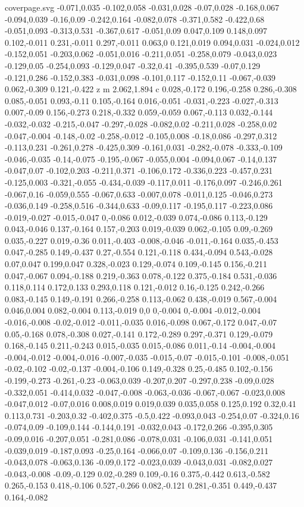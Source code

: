 \begin{filecontents}[noheader]{coverpage.svg}
-0.071,0.035 -0.102,0.058 -0.031,0.028 -0.07,0.028 -0.168,0.067 -0.094,0.039 -0.16,0.09 -0.242,0.164 -0.082,0.078 -0.371,0.582 -0.422,0.68 -0.051,0.093 -0.313,0.531 -0.367,0.617 -0.051,0.09 0.047,0.109 0.148,0.097 0.102,-0.011 0.231,-0.011 0.297,-0.011 0.063,0 0.121,0.019 0.094,0.031 -0.024,0.012 -0.152,0.051 -0.203,0.062 -0.051,0.016 -0.211,0.051 -0.258,0.079 -0.043,0.023 -0.129,0.05 -0.254,0.093 -0.129,0.047 -0.32,0.41 -0.395,0.539 -0.07,0.129 -0.121,0.286 -0.152,0.383 -0.031,0.098 -0.101,0.117 -0.152,0.11 -0.067,-0.039 0.062,-0.309 0.121,-0.422 z m 2.062,1.894 c 0.028,-0.172 0.196,-0.258 0.286,-0.308 0.085,-0.051 0.093,-0.11 0.105,-0.164 0.016,-0.051 -0.031,-0.223 -0.027,-0.313 0.007,-0.09 0.156,-0.273 0.218,-0.332 0.059,-0.059 0.067,-0.113 0.032,-0.144 -0.032,-0.032 -0.215,-0.047 -0.297,-0.028 -0.082,0.02 -0.211,0.028 -0.258,0.02 -0.047,-0.004 -0.148,-0.02 -0.258,-0.012 -0.105,0.008 -0.18,0.086 -0.297,0.312 -0.113,0.231 -0.261,0.278 -0.425,0.309 -0.161,0.031 -0.282,-0.078 -0.333,-0.109 -0.046,-0.035 -0.14,-0.075 -0.195,-0.067 -0.055,0.004 -0.094,0.067 -0.14,0.137 -0.047,0.07 -0.102,0.203 -0.211,0.371 -0.106,0.172 -0.336,0.223 -0.457,0.231 -0.125,0.003 -0.321,-0.055 -0.434,-0.039 -0.117,0.011 -0.176,0.097 -0.246,0.261 -0.067,0.16 -0.059,0.555 -0.067,0.633 -0.007,0.078 -0.011,0.125 -0.046,0.273 -0.036,0.149 -0.258,0.516 -0.344,0.633 -0.09,0.117 -0.195,0.117 -0.223,0.086 -0.019,-0.027 -0.015,-0.047 0,-0.086 0.012,-0.039 0.074,-0.086 0.113,-0.129 0.043,-0.046 0.137,-0.164 0.157,-0.203 0.019,-0.039 0.062,-0.105 0.09,-0.269 0.035,-0.227 0.019,-0.36 0.011,-0.403 -0.008,-0.046 -0.011,-0.164 0.035,-0.453 0.047,-0.285 0.149,-0.437 0.27,-0.554 0.121,-0.118 0.434,-0.094 0.543,-0.028 0.07,0.047 0.199,0.047 0.328,-0.023 0.129,-0.074 0.109,-0.145 0.156,-0.211 0.047,-0.067 0.094,-0.188 0.219,-0.363 0.078,-0.122 0.375,-0.184 0.531,-0.036 0.118,0.114 0.172,0.133 0.293,0.118 0.121,-0.012 0.16,-0.125 0.242,-0.266 0.083,-0.145 0.149,-0.191 0.266,-0.258 0.113,-0.062 0.438,-0.019 0.567,-0.004 0.046,0.004 0.082,-0.004 0.113,-0.019 0,0 0,-0.004 0,-0.004 -0.012,-0.004 -0.016,-0.008 -0.02,-0.012 -0.011,-0.035 0.016,-0.098 0.067,-0.172 0.047,-0.07 0.05,-0.168 0.078,-0.308 0.027,-0.141 0.172,-0.289 0.297,-0.371 0.129,-0.079 0.168,-0.145 0.211,-0.243 0.015,-0.035 0.015,-0.086 0.011,-0.14 -0.004,-0.004 -0.004,-0.012 -0.004,-0.016 -0.007,-0.035 -0.015,-0.07 -0.015,-0.101 -0.008,-0.051 -0.02,-0.102 -0.02,-0.137 -0.004,-0.106 0.149,-0.328 0.25,-0.485 0.102,-0.156 -0.199,-0.273 -0.261,-0.23 -0.063,0.039 -0.207,0.207 -0.297,0.238 -0.09,0.028 -0.332,0.051 -0.414,0.032 -0.047,-0.008 -0.063,-0.036 -0.067,-0.067 -0.023,0.008 -0.047,0.012 -0.07,0.016 0.008,0.019 0.019,0.039 0.035,0.058 0.125,0.192 0.32,0.41 0.113,0.731 -0.203,0.32 -0.402,0.375 -0.5,0.422 -0.093,0.043 -0.254,0.07 -0.324,0.16 -0.074,0.09 -0.109,0.144 -0.144,0.191 -0.032,0.043 -0.172,0.266 -0.395,0.305 -0.09,0.016 -0.207,0.051 -0.281,0.086 -0.078,0.031 -0.106,0.031 -0.141,0.051 -0.039,0.019 -0.187,0.093 -0.25,0.164 -0.066,0.07 -0.109,0.136 -0.156,0.211 -0.043,0.078 -0.063,0.136 -0.09,0.172 -0.023,0.039 -0.043,0.031 -0.082,0.027 -0.043,-0.008 -0.09,-0.129 0.02,-0.289 0.109,-0.16 0.375,-0.442 0.613,-0.582 0.265,-0.153 0.418,-0.106 0.527,-0.266 0.082,-0.121 0.281,-0.351 0.449,-0.437 0.164,-0.082 
\end{filecontents}
